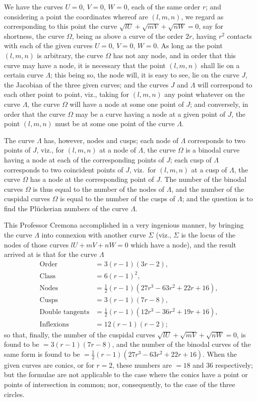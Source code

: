 \documentclass[11pt,a4paper]{article}
\theoremstyle{plain}
\theoremstyle{definition}
\theoremstyle{remark}
\begin{document}
\newpage
\setcounter{page}{604}

We have the curves $U=0$, $V=0$, $W=0$, each of the same order $r$; and considering a point the coordinates whereof are $(l,m,n)$, we regard as corresponding to this point the curve $\sqrt{lU}+\sqrt{mV}+\sqrt{nW}=0$, say for shortness, the curve $\Omega$, being as above a curve of the order $2r$, having $r^2$ contacts with each of the given curves $U=0$, $V=0$, $W=0$. As long as the point $(l,m,n)$ is arbitrary, the curve $\Omega$ has not any node, and in order that this curve may have a node, it is necessary that the point $(l,m,n)$ shall lie on a certain curve $\Lambda$; this being so, the node will, it is easy to see, lie on the curve $J$, the Jacobian of the three given curves; and the curves $J$ and $\Lambda$ will correspond to each other point to point, viz., taking for $(l,m,n)$ any point whatever on the curve $\Lambda$, the curve $\Omega$ will have a node at some one point of $J$; and conversely, in order that the curve $\Omega$ may be a curve having a node at a given point of $J$, the point $(l,m,n)$ must be at some one point of the curve $\Lambda$.

The curve $\Lambda$ has, however, nodes and cusps; each node of $\Lambda$ corresponds to two points of $J$, viz., for $(l,m,n)$ at a node of $\Lambda$, the curve $\Omega$ is a binodal curve having a node at each of the corresponding points of $J$; each cusp of $\Lambda$ corresponds to two coincident points of $J$, viz.\ for $(l,m,n)$ at a cusp of $\Lambda$, the curve $\Omega$ has a node at the corresponding point of $J$. The number of the binodal curves $\Omega$ is thus equal to the number of the nodes of $\Lambda$, and the number of the cuspidal curves $\Omega$ is equal to the number of the cusps of $\Lambda$; and the question is to find the Pl\"{u}ckerian numbers of the curve $\Lambda$.

This Professor Cremona accomplished in a very ingenious manner, by bringing the curve $\Lambda$ into connexion with another curve $\Sigma$ (viz., $\Sigma$ is the locus of the nodes of those curves $lU+mV+nW=0$ which have a node), and the result arrived at is that for the curve $\Lambda$
\begin{align*}
\text{Order} &= 3(r-1)(3r-2),\\
\text{Class} &= 6(r-1)^2,\\
\text{Nodes} &= \tfrac{1}{2}(r-1)(27r^3-63r^2+22r+16),\\
\text{Cusps} &= 3(r-1)(7r-8),\\
\text{Double tangents} &= \tfrac{1}{2}(r-1)(12r^3-36r^2+19r+16),\\
\text{Inflexions} &= 12(r-1)(r-2);
\end{align*}
so that, finally, the number of the cuspidal curves $\sqrt{lU}+\sqrt{mV}+\sqrt{nW}=0$, is found to be $=3(r-1)(7r-8)$, and the number of the binodal curves of the same form is found to be $=\tfrac{1}{2}(r-1)(27r^3-63r^2+22r+16)$. When the given curves are conics, or for $r=2$, these numbers are $=18$ and $36$ respectively; but the formulae are not applicable to the case where the conics have a point or points of intersection in common; nor, consequently, to the case of the three circles.
\end{document}

